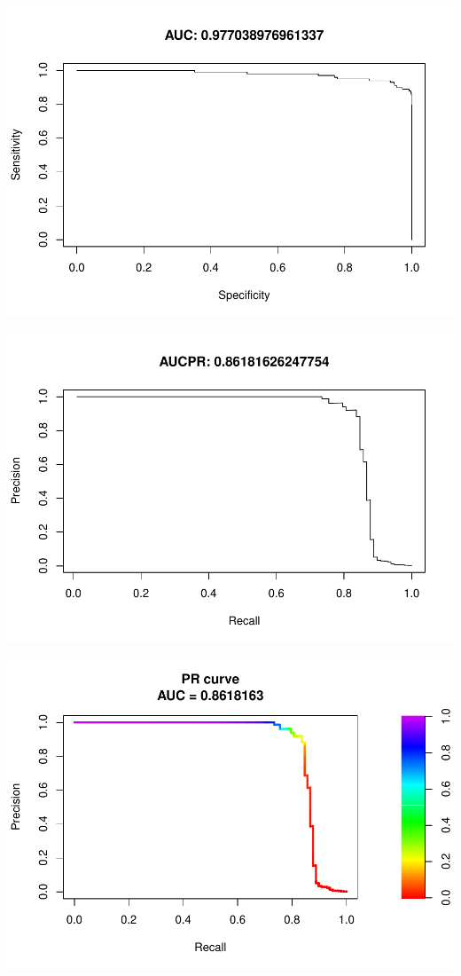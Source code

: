 \documentclass[]{article}
\begin{document}
\begin{center}\includegraphics{Credit_Card_Fraud_Detection_Project_Report_files/figure-latex/unnamed-chunk-25-21} \end{center}

\begin{center}\includegraphics{Credit_Card_Fraud_Detection_Project_Report_files/figure-latex/unnamed-chunk-25-22} \end{center}

\begin{center}\includegraphics{Credit_Card_Fraud_Detection_Project_Report_files/figure-latex/unnamed-chunk-25-23} \end{center}
\end{document}
